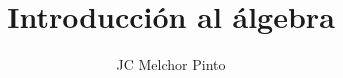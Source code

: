 \documentclass[12pt,addpoints,answers]{guia}
\title{Introducción al álgebra}
\author{JC Melchor Pinto}
\begin{document}
\INFO%
\begin{questions}
    \question
\end{questions}
\end{document}
